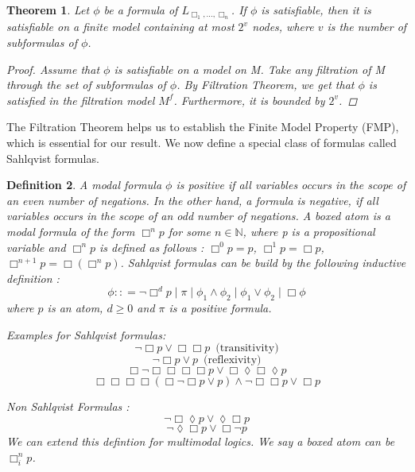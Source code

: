\documentclass[12pt, a4paper]{scrartcl}
\newtheorem{definition}{Definition}[subsection]
\newtheorem{theorem}[definition]{Theorem}
\begin{document}
\begin{theorem}
    Let $\phi$ be a formula of $L_{\Box_1,...,\Box_n}$. If $\phi$ is satisfiable, then it is satisfiable on a finite model containing at most $2^v$ nodes, where $v$ is the number of subformulas of $\phi$.

    \begin{proof}
    Assume that $\phi$ is satisfiable on a model on M. Take any filtration of M through the set of subformulas of $\phi$. 
    By Filtration Theorem, we get that $\phi$ is satisfied in the filtration model $M^f$. Furthermore, it is bounded by $2^v$.
    
    \end{proof}
        
\end{theorem}
    The Filtration Theorem helps us to establish the Finite Model Property (FMP), 
    which is essential for our result. We now define a special class of formulas called Sahlqvist formulas.
\begin{definition}
    A modal formula $\phi$ is positive if all variables occurs in the scope of an even number of negations. In the other hand, a formula is negative, if all variables occurs in the scope of an odd number of negations.
    A boxed atom is a modal formula of the form $\Box^n p$ for some $n \in \mathbb{N}$, where p is a propositional variable and $\Box^n p$ is defined as follows :
    $\Box^0 p = p$, $\Box^1 p = \Box p$, $\Box^{n+1} p = \Box(\Box^n p)$. \newline \newline
    Sahlqvist formulas can be build by the following inductive definition : 
    $$\phi :: = \neg\Box^d p \mid \pi \mid \phi_1 \land \phi_2 \mid \phi_1 \lor \phi_2 \mid \Box \phi$$
    where $p$ is an atom, $d \geq 0$ and $\pi$ is a positive formula. \newline 
    
    Examples for Sahlqvist formulas: 
    $$\neg \Box p \lor \Box\Box p \, \, \,\text{(transitivity)}$$
    $$ \neg \Box p \lor p \, \, \, \text{(reflexivity)}$$
    $$ \Box \neg \Box \Box \Box \Box p \lor \Box \lozenge \Box \lozenge p$$
    $$ \Box\Box\Box\Box(\Box \neg \Box p \lor p) \land \neg \Box \Box p \lor \Box p $$
    
    Non Sahlqvist Formulas :
    $$\neg \Box \lozenge p \lor \lozenge \Box p$$
    $$\neg \lozenge \Box p \lor \Box \neg p$$ \newline
    We can extend this defintion for multimodal logics. We say a boxed atom can be $\Box^n_i p$.
\end{definition}
\end{document}
